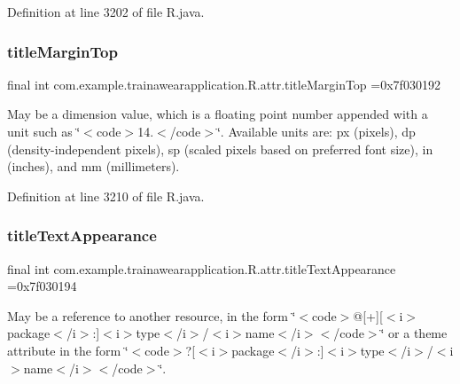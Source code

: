 Definition at line 3202 of file R.\+java.

\mbox{\label{classcom_1_1example_1_1trainawearapplication_1_1_r_1_1attr_af968df1a7cf49d006da04fb044fd9529}} 
\subsubsection{\texorpdfstring{titleMarginTop}{titleMarginTop}}
{\footnotesize\ttfamily final int com.\+example.\+trainawearapplication.\+R.\+attr.\+title\+Margin\+Top =0x7f030192\hspace{0.3cm}{\ttfamily [static]}}

May be a dimension value, which is a floating point number appended with a unit such as \char`\"{}$<$code$>$14.\+5sp$<$/code$>$\char`\"{}. Available units are\+: px (pixels), dp (density-\/independent pixels), sp (scaled pixels based on preferred font size), in (inches), and mm (millimeters). 

Definition at line 3210 of file R.\+java.

\mbox{\label{classcom_1_1example_1_1trainawearapplication_1_1_r_1_1attr_ac78eb1665e04a23d707b7a743835a6e6}} 
\subsubsection{\texorpdfstring{titleTextAppearance}{titleTextAppearance}}
{\footnotesize\ttfamily final int com.\+example.\+trainawearapplication.\+R.\+attr.\+title\+Text\+Appearance =0x7f030194\hspace{0.3cm}{\ttfamily [static]}}

May be a reference to another resource, in the form \char`\"{}$<$code$>$@\mbox{[}+\mbox{]}\mbox{[}$<$i$>$package$<$/i$>$\+:\mbox{]}$<$i$>$type$<$/i$>$/$<$i$>$name$<$/i$>$$<$/code$>$\char`\"{} or a theme attribute in the form \char`\"{}$<$code$>$?\mbox{[}$<$i$>$package$<$/i$>$\+:\mbox{]}$<$i$>$type$<$/i$>$/$<$i$>$name$<$/i$>$$<$/code$>$\char`\"{}. 

